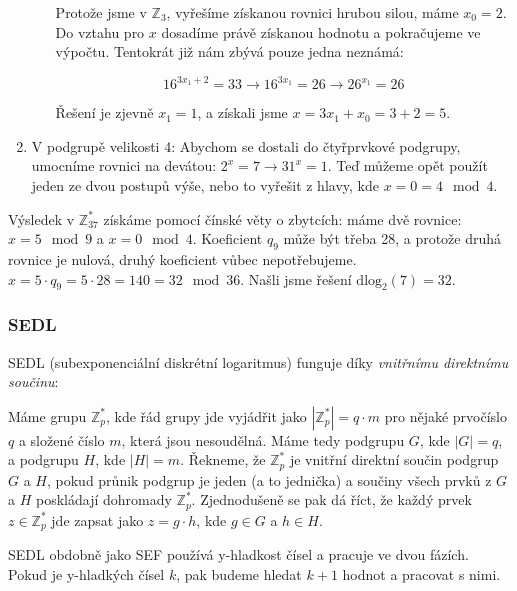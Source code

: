 \begin{exercise}
\begin{enumerate}
\begin{itemize}
Protože jsme v $\mathbb{Z}_{3}$, vyřešíme získanou rovnici hrubou silou, máme
$x_0 = 2$. Do vztahu pro $x$ dosadíme právě získanou hodnotu a pokračujeme ve
výpočtu. Tentokrát již nám zbývá pouze jedna neznámá:

$$ 16^{3x_1 + 2} = 33  \xrightarrow{} 16^{3x_1} = 26 \xrightarrow{} 26^{x_1} =
26$$

Řešení je zjevně $x_1 = 1$, a získali jsme $x = 3x_1 + x_0 = 3 + 2 = 5$.
\end{itemize}
\item V podgrupě velikosti 4: Abychom se dostali do čtyřprvkové podgrupy,
umocníme rovnici na devátou: $2^x = 7 \rightarrow{} 31^x = 1$. Teď můžeme opět
použít jeden ze dvou postupů výše, nebo to vyřešit z hlavy, kde $x = 0 = 4 \mod
4$.
\end{enumerate}

Výsledek v $\mathbb{Z}_{37}^*$ získáme pomocí čínské věty o zbytcích: máme dvě
rovnice: $x = 5 \mod 9$ a $x = 0 \mod 4$. Koeficient $q_9$ může být třeba 28, a
protože druhá rovnice je nulová, druhý koeficient vůbec nepotřebujeme. $x =
5\cdot q_9 = 5\cdot 28 = 140 = 32 \mod 36$. Našli jsme řešení $\text{dlog}_2(7)
= 32$.
\end{exercise}

\subsubsection{SEDL}
SEDL (subexponenciální diskrétní logaritmus) funguje díky \textit{vnitřnímu
direktnímu součinu}:

Máme grupu $\mathbb{Z}_p^*$, kde řád grupy jde vyjádřit jako $|\mathbb{Z}_p^*| =
q\cdot m$ pro nějaké prvočíslo $q$ a složené číslo $m$, která jsou nesoudělná.
Máme tedy podgrupu $G$, kde $|G| = q$, a podgrupu $H$, kde $|H| = m$. Řekneme,
že $\mathbb{Z}_p^*$ je vnitřní direktní součin podgrup $G$ a $H$, pokud průnik
podgrup je jeden (a to jednička) a součiny všech prvků z $G$ a $H$ poskládají
dohromady $\mathbb{Z}_p^*$. Zjednodušeně se pak dá říct, že každý prvek $z \in
\mathbb{Z}_p^*$ jde zapsat jako $z = g\cdot h$, kde $g \in G$ a $h \in H$.

SEDL obdobně jako SEF používá y-hladkost čísel a pracuje ve dvou fázích. Pokud
je y-hladkých čísel $k$, pak budeme hledat $k+1$ hodnot a pracovat s nimi. 


